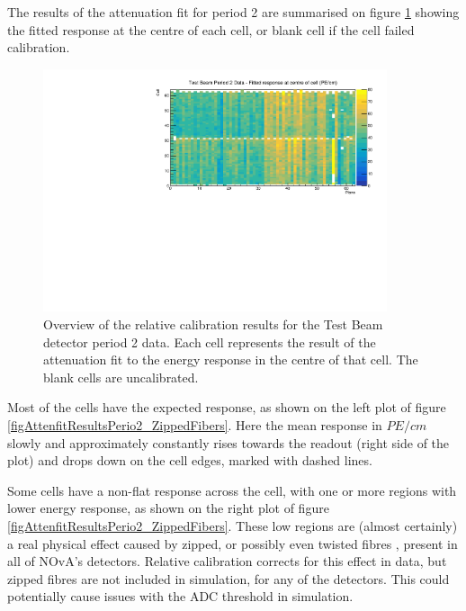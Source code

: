 \documentclass[12pt,a4paper]{article}
\begin{document}
The results of the attenuation fit for period 2 are summarised on figure \ref{figCellCentreResponsePeriod2} showing the fitted response at the centre of each cell, or blank cell if the cell failed calibration.

\begin{figure}[h]
\centering
\includegraphics[width=0.9\textwidth]{Plots/CellResponseAtCentre_period2_Limited.pdf}
\caption{Overview of the relative calibration results for the Test Beam detector period 2 data. Each cell represents the result of the attenuation fit to the energy response in the centre of that cell. The blank cells are uncalibrated.}
\label{figCellCentreResponsePeriod2}
\end{figure}

Most of the cells have the expected response, as shown on the left plot of figure \ref{figAttenfitResultsPerio2_ZippedFibers}. Here the mean response in $\unit{PE/cm}$ slowly and approximately constantly rises towards the readout (right side of the plot) and drops down on the cell edges, marked with dashed lines.

Some cells have a non-flat response across the cell, with one or more regions with lower energy response, as shown on the right plot of figure \ref{figAttenfitResultsPerio2_ZippedFibers}. These low regions are (almost certainly) a real physical effect caused by zipped, or possibly even twisted fibres \cite{NOVA-doc-43249}, present in all of NOvA's detectors. Relative calibration corrects for this effect in data, but zipped fibres are not included in simulation, for any of the detectors. This could potentially cause issues with the ADC threshold in simulation.
\end{document}
